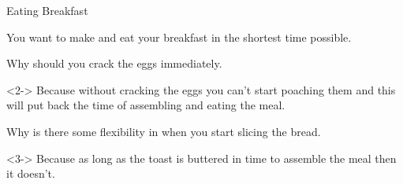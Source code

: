 \documentclass[8pt]{beamer}
\begin{document}
\begin{frame}{Eating Breakfast}
\begin{center}
\begin{tikzpicture}
\end{tikzpicture}
\end{center}


	You want to make and eat your breakfast in the shortest time possible.
	
	\begin{problem}
		Why should you crack the eggs immediately.
	\end{problem}
	
	\begin{solution}<2->
		Because without cracking the eggs you can’t start poaching them and this will put back the time of assembling and eating the meal.
	\end{solution}

	\begin{problem}
		Why is there some flexibility in when you start slicing the bread.
		
	\end{problem}

	\begin{solution}<3->
		Because as long as the toast is buttered in time to assemble the meal then it doesn't.
		
	\end{solution}
\end{frame}
\end{document}
